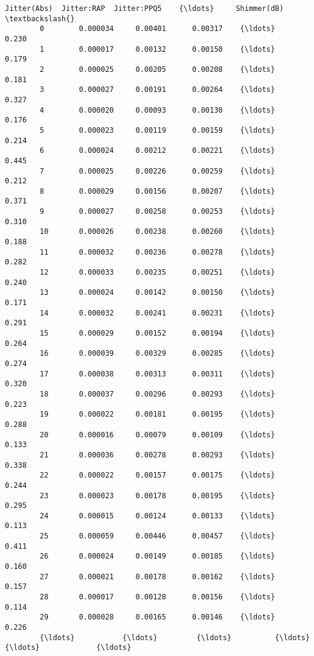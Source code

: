 \documentclass[11pt]{article}
\begin{document}
\begin{Verbatim}[commandchars=\\\{\}]
              Jitter(Abs)  Jitter:RAP  Jitter:PPQ5    {\ldots}     Shimmer(dB)  \textbackslash{}
        0        0.000034     0.00401      0.00317    {\ldots}           0.230   
        1        0.000017     0.00132      0.00150    {\ldots}           0.179   
        2        0.000025     0.00205      0.00208    {\ldots}           0.181   
        3        0.000027     0.00191      0.00264    {\ldots}           0.327   
        4        0.000020     0.00093      0.00130    {\ldots}           0.176   
        5        0.000023     0.00119      0.00159    {\ldots}           0.214   
        6        0.000024     0.00212      0.00221    {\ldots}           0.445   
        7        0.000025     0.00226      0.00259    {\ldots}           0.212   
        8        0.000029     0.00156      0.00207    {\ldots}           0.371   
        9        0.000027     0.00258      0.00253    {\ldots}           0.310   
        10       0.000026     0.00238      0.00260    {\ldots}           0.188   
        11       0.000032     0.00236      0.00278    {\ldots}           0.282   
        12       0.000033     0.00235      0.00251    {\ldots}           0.240   
        13       0.000024     0.00142      0.00150    {\ldots}           0.171   
        14       0.000032     0.00241      0.00231    {\ldots}           0.291   
        15       0.000029     0.00152      0.00194    {\ldots}           0.264   
        16       0.000039     0.00329      0.00285    {\ldots}           0.274   
        17       0.000038     0.00313      0.00311    {\ldots}           0.320   
        18       0.000037     0.00296      0.00293    {\ldots}           0.223   
        19       0.000022     0.00181      0.00195    {\ldots}           0.288   
        20       0.000016     0.00079      0.00109    {\ldots}           0.133   
        21       0.000036     0.00278      0.00293    {\ldots}           0.338   
        22       0.000022     0.00157      0.00175    {\ldots}           0.244   
        23       0.000023     0.00178      0.00195    {\ldots}           0.295   
        24       0.000015     0.00124      0.00133    {\ldots}           0.113   
        25       0.000059     0.00446      0.00457    {\ldots}           0.411   
        26       0.000024     0.00149      0.00185    {\ldots}           0.160   
        27       0.000021     0.00178      0.00162    {\ldots}           0.157   
        28       0.000017     0.00128      0.00156    {\ldots}           0.114   
        29       0.000028     0.00165      0.00146    {\ldots}           0.226   
        {\ldots}           {\ldots}         {\ldots}          {\ldots}    {\ldots}             {\ldots}   

\end{Verbatim}
\end{document}
